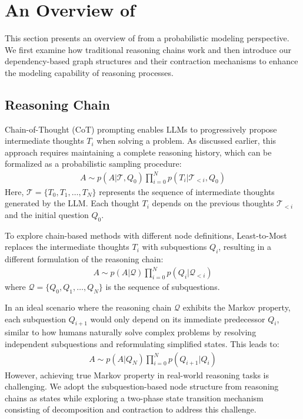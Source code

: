 \section{An Overview of \our}
\label{sec:preliminary}

This section presents an overview of \our from a probabilistic modeling perspective. We first examine how traditional reasoning chains work and then introduce our dependency-based graph structures and their contraction mechanisms to enhance the modeling capability of reasoning processes. 

\subsection{Reasoning Chain}
Chain-of-Thought (CoT) prompting enables LLMs to progressively propose intermediate thoughts $T_i$ when solving a problem. As discussed earlier, this approach requires maintaining a complete reasoning history, which can be formalized as a probabilistic sampling procedure:
\begin{align}  
A \sim p(A|\mathcal{T}, Q_0) \prod_{i=0}^N p(T_i|\mathcal{T}_{<i}, Q_0)  
\end{align}
Here, $\mathcal{T} = \{T_0, T_1, \dots, T_N\}$ represents the sequence of intermediate thoughts generated by the LLM. Each thought $T_i$ depends on the previous thoughts $\mathcal{T}_{<i}$ and the initial question $Q_0$.

To explore chain-based methods with different node definitions, Least-to-Most~\cite{zhou2023least} replaces the intermediate thoughts $T_i$ with subquestions $Q_i$, resulting in a different formulation of the reasoning chain:
\begin{align}  
A \sim p(A|\mathcal{Q}) \prod_{i=0}^N p(Q_i|\mathcal{Q}_{<i})  
\end{align}  
where $\mathcal{Q} = \{Q_0, Q_1, \dots, Q_N\}$ is the sequence of subquestions.

In an ideal scenario where the reasoning chain $\mathcal{Q}$ exhibits the Markov property, each subquestion $Q_{i+1}$ would only depend on its immediate predecessor $Q_i$, similar to how humans naturally solve complex problems by resolving independent subquestions and reformulating simplified states. This leads to:
\begin{align}
A \sim p(A|Q_N) \prod_{i=0}^N p(Q_{i+1}|Q_i)
\end{align}
However, achieving true Markov property in real-world reasoning tasks is challenging. We adopt the subquestion-based node structure from reasoning chains as states while exploring a two-phase state transition mechanism consisting of decomposition and contraction to address this challenge.

